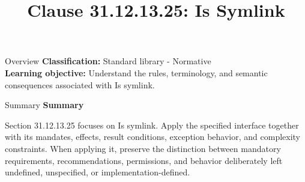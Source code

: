 \documentclass[10pt,letterpaper]{article}
\title{Clause 31.12.13.25: Is Symlink}
\author{}
\date{}
\begin{document}
\maketitle
\begin{CornellOverviewBox}{Overview}
\textbf{Classification:} Standard library - Normative\\[2pt]
\textbf{Learning objective:} Understand the rules, terminology, and semantic consequences associated with Is symlink.
\end{CornellOverviewBox}\begin{CornellSummaryBox}{Summary}
{\sffamily\bfseries\color{Accent} Summary}\par\vspace{3pt}Section 31.12.13.25 focuses on Is symlink. Apply the specified interface together with its mandates, effects, result conditions, exception behavior, and complexity constraints. When applying it, preserve the distinction between mandatory requirements, recommendations, permissions, and behavior deliberately left undefined, unspecified, or implementation-defined.
\end{CornellSummaryBox}
\end{document}

